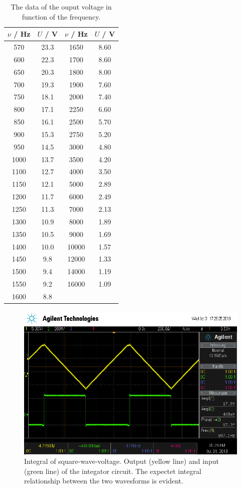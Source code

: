 \begin{table}
  \centering
  \caption{The data of the ouput voltage in function of the frequency.}
  \label{tab:2}
  \begin{tabular}{c c| c c}
    \toprule
    $\nu$ / \si{\hertz} & $U$ / \si{\volt} & $\nu$ / \si{\hertz} & $U$ / \si{\volt} \\
    \midrule
    570  & 23.3  &  1650  & 8.60 \\
    600  & 22.3  &  1700  & 8.60 \\
    650  & 20.3  &  1800  & 8.00 \\
    700  & 19.3  &  1900  & 7.60 \\
    750  & 18.1  &  2000  & 7.40 \\
    800  & 17.1  &  2250  & 6.60 \\
    850  & 16.1  &  2500  & 5.70 \\
    900  & 15.3  &  2750  & 5.20 \\
    950  & 14.5  &  3000  & 4.80 \\
    1000 & 13.7  &  3500  & 4.20 \\
    1100 & 12.7  &  4000  & 3.50 \\
    1150 & 12.1  &  5000  & 2.89 \\
    1200 & 11.7  &  6000  & 2.49 \\
    1250 & 11.3  &  7000  & 2.13 \\
    1300 & 10.9  &  8000  & 1.89 \\
    1350 & 10.5  &  9000  & 1.69 \\
    1400 & 10.0  &  10000 & 1.57 \\
    1450 & 9.8   &  12000 & 1.33 \\
    1500 & 9.4   &  14000 & 1.19 \\
    1550 & 9.2   &  16000 & 1.09 \\
    1600 & 8.8   &        &      \\
    \bottomrule
  \end{tabular}
\end{table}
\begin{figure}
  \centering
  \includegraphics[scale=0.4]{scope_2.png}
  \caption{Integral of square-wave-voltage. Output (yellow line) and input (green line) of the integator circuit. The expectet integral relationship between the two wavesforms is evident.}
  \label{abb:3}
\end{figure}
